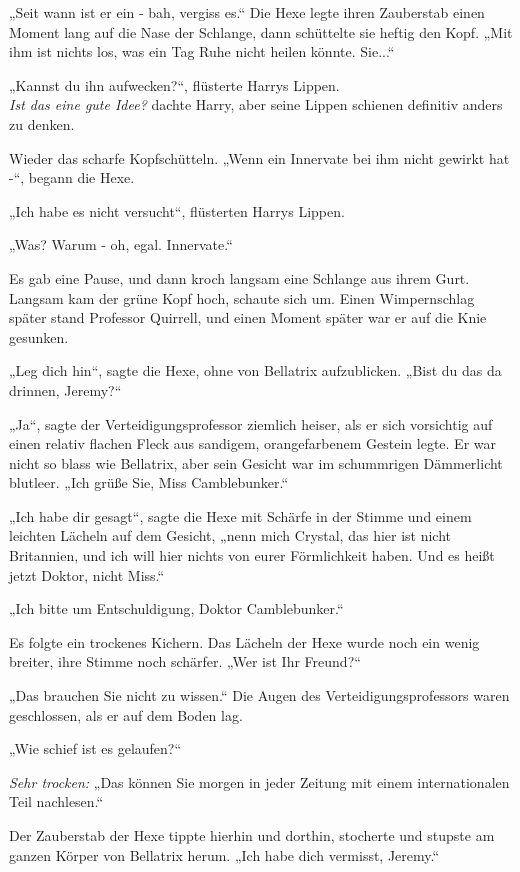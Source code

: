 {„Seit wann ist er ein - bah, vergiss es.“ Die Hexe legte ihren Zauberstab einen Moment lang auf die Nase der Schlange, dann schüttelte sie heftig den Kopf. „Mit ihm ist nichts los, was ein Tag Ruhe nicht heilen könnte. Sie...“

„Kannst du ihn aufwecken?“, flüsterte Harrys Lippen.\\ \emph{Ist das eine gute Idee?} dachte Harry, aber seine Lippen schienen definitiv anders zu denken.

Wieder das scharfe Kopfschütteln. „Wenn ein Innervate bei ihm nicht gewirkt hat -“, begann die Hexe.

„Ich habe es nicht versucht“, flüsterten Harrys Lippen.

„Was? Warum - oh, egal. Innervate.“

Es gab eine Pause, und dann kroch langsam eine Schlange aus ihrem Gurt. Langsam kam der grüne Kopf hoch, schaute sich um. Einen Wimpernschlag später stand Professor Quirrell, und einen Moment später war er auf die Knie gesunken.

„Leg dich hin“, sagte die Hexe, ohne von Bellatrix aufzublicken. „Bist du das da drinnen, Jeremy?“

„Ja“, sagte der Verteidigungsprofessor ziemlich heiser, als er sich vorsichtig auf einen relativ flachen Fleck aus sandigem, orangefarbenem Gestein legte. Er war nicht so blass wie Bellatrix, aber sein Gesicht war im schummrigen Dämmerlicht blutleer. „Ich grüße Sie, Miss Camblebunker.“

„Ich habe dir gesagt“, sagte die Hexe mit Schärfe in der Stimme und einem leichten Lächeln auf dem Gesicht, „nenn mich Crystal, das hier ist nicht Britannien, und ich will hier nichts von eurer Förmlichkeit haben. Und es heißt jetzt Doktor, nicht Miss.“

„Ich bitte um Entschuldigung, Doktor Camblebunker.“

Es folgte ein trockenes Kichern. Das Lächeln der Hexe wurde noch ein wenig breiter, ihre Stimme noch schärfer. „Wer ist Ihr Freund?“

„Das brauchen Sie nicht zu wissen.“ Die Augen des Verteidigungsprofessors waren geschlossen, als er auf dem Boden lag.

„Wie schief ist es gelaufen?“

\emph{Sehr trocken:} „Das können Sie morgen in jeder Zeitung mit einem internationalen Teil nachlesen.“

Der Zauberstab der Hexe tippte hierhin und dorthin, stocherte und stupste am ganzen Körper von Bellatrix herum. „Ich habe dich vermisst, Jeremy.“

}
